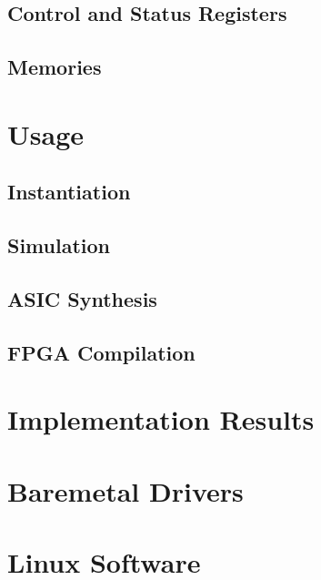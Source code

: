 \documentclass{ug}
\begin{document}
\ifdefined\CSRS
\subsection{Control and Status Registers}
\label{sec:csrs}

\fi

\ifdefined\MEMS
\subsection{Memories}
\label{sec:mems}

\fi

\ifdefined\SECTIONCLEARPAGE
\clearpage
\fi
\section{Usage}

\subsection{Instantiation}
\label{sec:inst}


\subsection{Simulation}
\label{sec:tbbd}


\subsection{ASIC Synthesis}
\label{sec:synth}


\subsection{FPGA Compilation}
\label{sec:fpga}


\ifdefined\RESULTS
\ifdefined\SECTIONCLEARPAGE
\clearpage
\fi
\section{Implementation Results}
\label{sec:results}

\fi

\ifdefined\DOXYGEN
\section{Baremetal Drivers}
\label{sec:baremetal}

\fi

\ifdefined\LINUX
\section{Linux Software}
\label{sec:linux}

\fi

\ifdefined\CUSTOM

\fi
\end{document}
